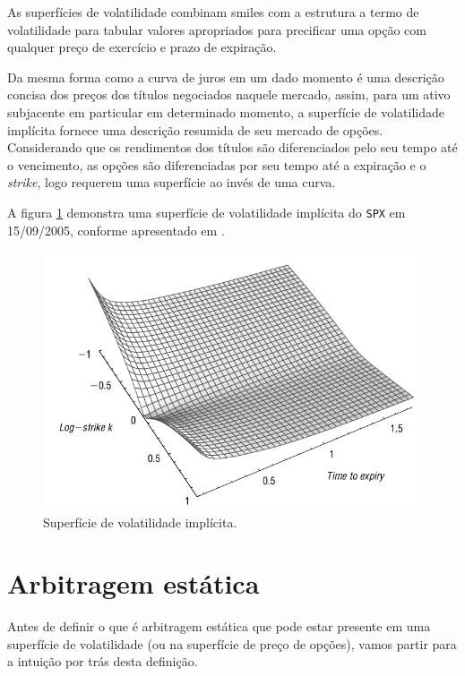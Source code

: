 \documentclass[]{book}
\theoremstyle{definition}
\theoremstyle{definition}
\theoremstyle{definition}
\theoremstyle{remark}
\begin{document}
As superfícies de volatilidade combinam smiles com a estrutura a termo de volatilidade para tabular valores apropriados para precificar uma opção com qualquer preço de exercício e prazo de expiração.

Da mesma forma como a curva de juros em um dado momento é uma descrição concisa dos preços dos títulos negociados naquele mercado, assim, para um ativo subjacente em particular em determinado momento, a superfície de volatilidade implícita fornece uma descrição resumida de seu mercado de opções. Considerando que os rendimentos dos títulos são diferenciados pelo seu tempo até o vencimento, as opções são diferenciadas por seu tempo até a expiração e o \emph{strike}, logo requerem uma superfície ao invés de uma curva.

A figura \ref{fig:superficie} demonstra uma superfície de volatilidade implícita do \texttt{SPX} em 15/09/2005, conforme apresentado em \citet{Gatheral2011}.

\begin{figure}
\centering
\includegraphics{./images/spx_vol_surface.png}
\caption{\label{fig:superficie}Superfície de volatilidade implícita.}
\end{figure}

\hypertarget{arbestatica}{%
\section{Arbitragem estática}\label{arbestatica}}

Antes de definir o que é arbitragem estática que pode estar presente em uma superfície de volatilidade (ou na superfície de preço de opções), vamos partir para a intuição por trás desta definição.
\end{document}
